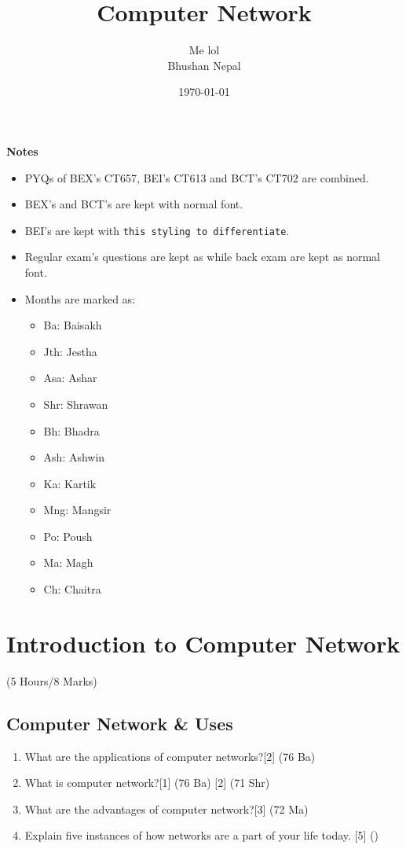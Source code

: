 \documentclass[12pt]{article}
\title{Computer Network}
\author{Me lol\\Bhushan Nepal}
\date{\today}
\begin{document}
\maketitle
\vspace{13cm}
\begin{large}\textbf{Notes}\end{large}
\begin{itemize}
\item PYQs of BEX's CT657, BEI's CT613 and BCT's CT702 are combined.
\item BEX's and BCT's are kept with normal font.\item BEI's are kept with \texttt{this styling to differentiate}.
\item Regular exam's questions are kept as  while back exam are kept as normal font.
\item Months are marked as: 
\begin{itemize}[noitemsep]
	\item Ba: Baisakh
	\item Jth: Jestha
	\item Asa: Ashar
	\item Shr: Shrawan
	\item Bh: Bhadra
	\item Ash: Ashwin
	\item Ka: Kartik
	\item Mng: Mangsir
	\item Po: Poush
	\item Ma: Magh
	\item Ch: Chaitra
\end{itemize}
\end{itemize}
\pagebreak
\tableofcontents
\pagebreak

\section{Introduction to Computer Network}
	\begin{center}(5 Hours/8 Marks)\end{center}
	\subsection{Computer Network \& Uses}
		\begin{enumerate}[noitemsep, topsep = 0pt]
			\item What are the applications of computer networks?\hfill[2] (76 Ba)
			\item What is computer network?\hfill[1] (76 Ba) [2] (71 Shr)
			\item What are the advantages of computer network?\hfill[3] (72 Ma)
			\item Explain five instances of how networks are a part of your life today. \hfill [5] ()
		\end{enumerate}
\end{document}
